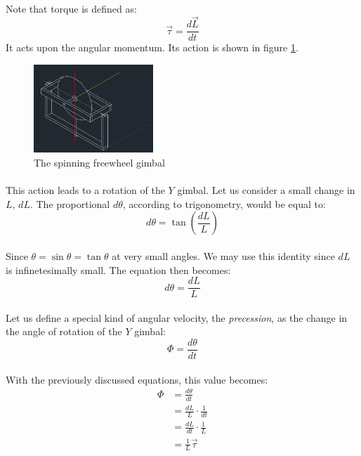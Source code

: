 \documentclass[a4paper]{article}
\begin{document}
\paragraph*{}
Note that torque is defined as:
$$\vec{\tau} = \frac{d \vec{L}}{dt}$$
It acts upon the angular momentum. Its action is shown in figure
\ref{fig:gimbal-fw-3}.

\begin{figure}[ht]
  \centering
  \includegraphics[width=0.4\textwidth]{img/gimbal-fw-3}
  \caption{The spinning freewheel gimbal}
  \label{fig:gimbal-fw-3}
\end{figure}

\paragraph*{}
This action leads to a rotation of the $Y$ gimbal. Let us consider a small
change in $L$, $dL$. The proportional $d \theta$, according to trigonometry,
would be equal to:
$$d \theta = \tan \left( \frac{dL}{L} \right) $$

\paragraph*{}
Since $\theta = \sin \theta = \tan \theta$ at very small angles. We may use
this identity since $dL$ is infinetesimally small. The equation then becomes:
$$d \theta = \frac{dL}{L}$$

\paragraph*{}
Let us define a special kind of angular velocity, the \textit{precession}, as
the change in the angle of rotation of the $Y$ gimbal:
$$\Phi = \frac{d \theta}{dt}$$

\paragraph*{}
With the previously discussed equations, this value becomes:
\begin{align*}
  \Phi &= \frac{d \theta}{dt} \\
  &= \frac{dL}{L} \cdot \frac{1}{dt} \\
  &= \frac{dL}{dt} \cdot \frac{1}{L} \\
  &= \frac{1}{L} \vec{\tau}
\end{align*}
\end{document}
